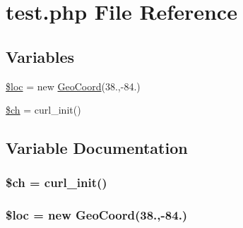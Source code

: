 \hypertarget{test_8php}{}\section{test.\+php File Reference}
\label{test_8php}
\subsection*{Variables}
\begin{DoxyCompactItemize}
\item 
\hyperlink{test_8php_a5b64ac9a38b866d891fcb47ca45c0b3d}{\$loc} = new \hyperlink{class_geo_coord}{Geo\+Coord}(38.,-\/84.)
\item 
\hyperlink{test_8php_a696b903bbc5c02914bdd402e91826eca}{\$ch} = curl\+\_\+init()
\end{DoxyCompactItemize}


\subsection{Variable Documentation}
\subsubsection[{\texorpdfstring{\$ch}{$ch}}]{\setlength{\rightskip}{0pt plus 5cm}\$ch = curl\+\_\+init()}\hypertarget{test_8php_a696b903bbc5c02914bdd402e91826eca}{}\label{test_8php_a696b903bbc5c02914bdd402e91826eca}
\subsubsection[{\texorpdfstring{\$loc}{$loc}}]{\setlength{\rightskip}{0pt plus 5cm}\$loc = new {\bf Geo\+Coord}(38.,-\/84.)}\hypertarget{test_8php_a5b64ac9a38b866d891fcb47ca45c0b3d}{}\label{test_8php_a5b64ac9a38b866d891fcb47ca45c0b3d}
